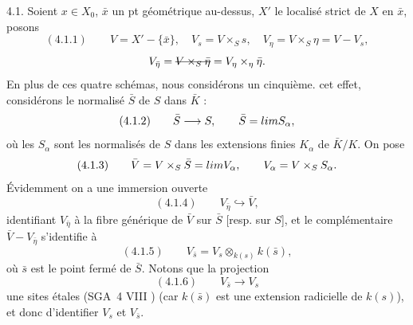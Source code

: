 \documentclass[11pt,a4paper]{article}
\begin{document}
4.1. Soient  $x \in X_0$, $\bar x$ un pt géométrique au-dessus, $X'$ le
localisé strict de $X$ en $\bar x$, posons
\[
(4.1.1)\qquad V = X' - \{\bar x\}, \quad V_s = V \times_S s, \quad
V_\eta = V \times_S \eta = V - V_s,
\]
\[
V_{\bar\eta} = \text{\struck{$V \times_S \bar\eta$}} = V_\eta \times_\eta \bar\eta .
\]
En plus de ces quatre schémas,  nous  considérons
un cinquième.   cet effet, considérons le normalisé $\bar S$ de $S$ dans
$\bar K$ :
\[
(4.1.2)\qquad \bar S \longrightarrow S, \qquad \bar S = \varprojlim S_\alpha ,
\]
 où les $S_\alpha$ sont les normalisés de $S$ dans les extensions finies
$K_\alpha$ de $\bar K / K$. \struck{\ill{}} On pose
\[
(4.1.3)\qquad \bar V = V \times_S \bar S = \varprojlim V_\alpha, \qquad
V_\alpha = V \times_S S_\alpha .
\]
 Évidemment on a  une immersion ouverte
\[
(4.1.4)\qquad V_{\bar\eta} \hookrightarrow \bar V ,
\]
identifiant $V_{\bar\eta}$ à la fibre générique de $\bar V$ sur $\bar S$ [resp. sur $S$],
et le complémentaire  $\bar V - V_{\bar\eta}$ \struck{\ill{}} s'identifie à
\[
(4.1.5)\qquad V_{\bar s} = V_s \otimes_{k(s)} k(\bar s),
\]
où $\bar s$ est le point fermé de $\bar S$. Notons que la projection
\[
(4.1.6)\qquad V_{\bar s} \longrightarrow V_s
\]
 une   sites étales (SGA~4 VIII \ill{})
(car $k(\bar s)$ est une extension radicielle de $k(s)$), et  
donc d'identifier $V_s$ et $V_{\bar s}$.
\end{document}
